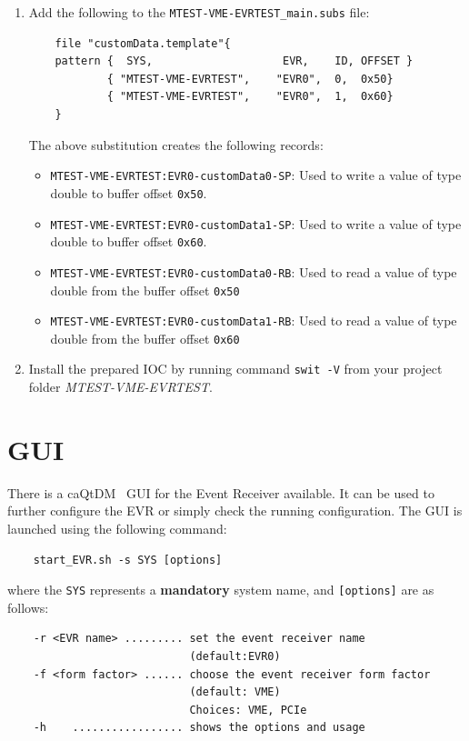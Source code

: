 \documentclass[12pt,a4paper]{article}
\begin{document}
\begin{enumerate}
\item Add the following to the \texttt{MTEST-VME-EVRTEST\_main.subs} file:
	\begin{verbatim}
	file "customData.template"{
	pattern {  SYS,                    EVR,    ID, OFFSET }
	        { "MTEST-VME-EVRTEST",    "EVR0",  0,  0x50}
	        { "MTEST-VME-EVRTEST",    "EVR0",  1,  0x60}
	}
	\end{verbatim}
	The above substitution creates the following records:
	\begin{itemize}
		\item \texttt{MTEST-VME-EVRTEST:EVR0-customData0-SP}: Used to write a value of type double to buffer offset \texttt{0x50}.
		\item \texttt{MTEST-VME-EVRTEST:EVR0-customData1-SP}: Used to write a value of type double to buffer offset \texttt{0x60}.
		\item \texttt{MTEST-VME-EVRTEST:EVR0-customData0-RB}: Used to read a value of type double from the buffer offset \texttt{0x50}
		\item \texttt{MTEST-VME-EVRTEST:EVR0-customData1-RB}: Used to read a value of type double from the buffer offset \texttt{0x60}
	\end{itemize}
\item Install the prepared IOC by running command \texttt{swit -V} from your project folder \textit{MTEST-VME-EVRTEST}.
\end{enumerate}

\section{GUI}\label{sec:gui} 
There is a caQtDM~\cite{caqtdm} GUI for the Event Receiver available. It can be used to further configure the EVR or simply check the running configuration. The GUI is launched using the following command:

\begin{verbatim}
	start_EVR.sh -s SYS [options]
\end{verbatim}
where the \texttt{SYS} represents a \textbf{mandatory} system name, and \texttt{[options]} are as follows:
\begin{verbatim}
	-r <EVR name> ......... set the event receiver name 
	                        (default:EVR0)
	-f <form factor> ...... choose the event receiver form factor 
	                        (default: VME)
	                        Choices: VME, PCIe
	-h    ................. shows the options and usage
\end{verbatim}
\end{document}
